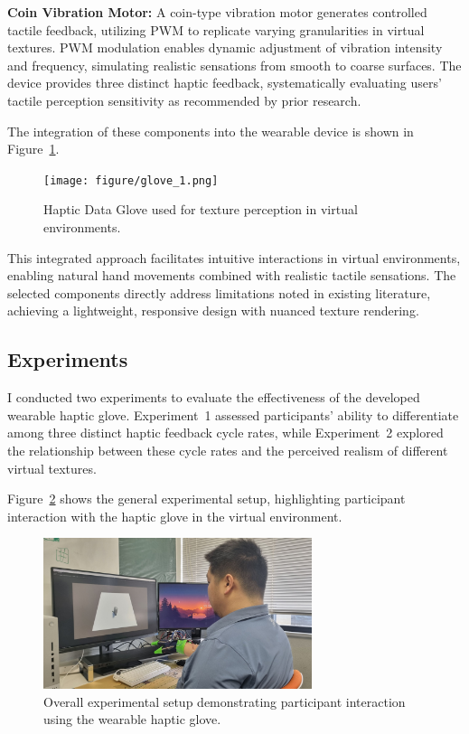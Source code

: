 \documentclass[graybox]{svmult}
\begin{document}
\textbf{Coin Vibration Motor:}
A coin-type vibration motor generates controlled tactile feedback, utilizing PWM to replicate varying granularities in virtual textures. PWM modulation enables dynamic adjustment of vibration intensity and frequency, simulating realistic sensations from smooth to coarse surfaces. The device provides three distinct haptic feedback, systematically evaluating users' tactile perception sensitivity as recommended by prior research.

The integration of these components into the wearable device is shown in Figure~\ref{fig:glove_1}.

\begin{figure}\centering
	\texttt{[image: figure/glove\_1.png]}%
	\caption{Haptic Data Glove used for texture perception in virtual environments.}\label{fig:glove_1}
\end{figure}

This integrated approach facilitates intuitive interactions in virtual environments, enabling natural hand movements combined with realistic tactile sensations. The selected components directly address limitations noted in existing literature, achieving a lightweight, responsive design with nuanced texture rendering.

\subsection{Experiments}\label{sec:Experiments}
I conducted two experiments to evaluate the effectiveness of the developed wearable haptic glove. Experiment~1 assessed participants' ability to differentiate among three distinct haptic feedback cycle rates, while Experiment~2 explored the relationship between these cycle rates and the perceived realism of different virtual textures.

Figure~\ref{fig:experiment_setup} shows the general experimental setup, highlighting participant interaction with the haptic glove in the virtual environment.

\begin{figure}\centering
	\includegraphics[width=0.7\textwidth]{figure/experiment.png}%
	\caption{Overall experimental setup demonstrating participant interaction using the wearable haptic glove.}\label{fig:experiment_setup}
\end{figure}
\end{document}

